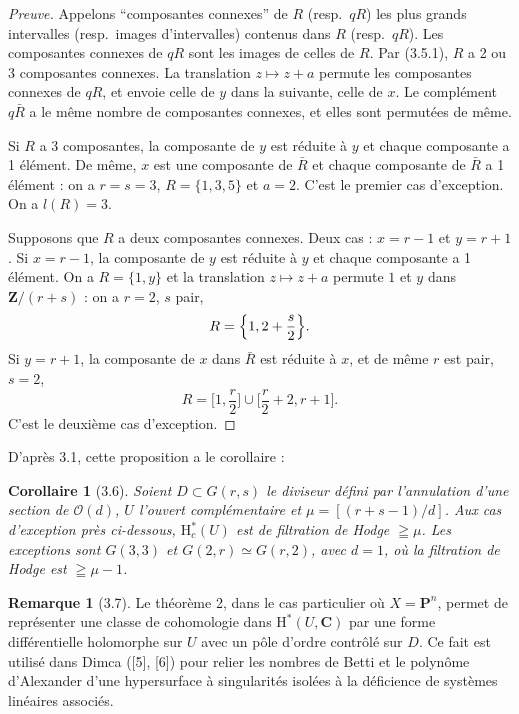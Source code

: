 \documentclass[12pt,a4paper]{article}
\theoremstyle{plain}
\newtheorem{corollary}[theorem]{Corollaire}
\theoremstyle{definition}
\newtheorem{remark}[theorem]{Remarque}
\begin{document}
\begin{proof}[Preuve]
Appelons ``composantes connexes'' de $R$ (resp.\ $qR$) les plus grands intervalles (resp.\ images d'intervalles) contenus dans $R$ (resp.\ $qR$). Les composantes connexes de $qR$ sont les images de celles de $R$. Par (3.5.1), $R$ a 2 ou 3 composantes connexes. La translation $z \mapsto z+a$ permute les composantes connexes de $qR$, et envoie celle de $y$ dans la suivante, celle de $x$. Le complément $q\bar{R}$ a le même nombre de composantes connexes, et elles sont permutées de même.

Si $R$ a 3 composantes, la composante de $y$ est réduite à $y$ et chaque composante a 1 élément. De même, $x$ est une composante de $\bar{R}$ et chaque composante de $\bar{R}$ a 1 élément : on a $r = s = 3$, $R = \{1, 3, 5\}$ et $a = 2$. C'est le premier cas d'exception. On a $l(R) = 3$.

Supposons que $R$ a deux composantes connexes. Deux cas : $x = r-1$ et $y = r+1$. Si $x = r-1$, la composante de $y$ est réduite à $y$ et chaque composante a 1 élément. On a $R = \{1, y\}$ et la translation $z \mapsto z+a$ permute $1$ et $y$ dans $\mathbf{Z}/(r+s)$ : on a $r = 2$, $s$ pair,
\[
R = \Bigl\{1, 2 + \frac{s}{2}\Bigr\}.
\]
Si $y = r+1$, la composante de $x$ dans $\bar{R}$ est réduite à $x$, et de même $r$ est pair, $s = 2$,
\[
R = \biggl[1, \frac{r}{2}\biggr] \cup \biggl[\frac{r}{2} + 2, r+1\biggr].
\]
C'est le deuxième cas d'exception.
\end{proof}

D'après 3.1, cette proposition a le corollaire :

\begin{corollary}[3.6]
Soient $D \subset G(r, s)$ le diviseur défini par l'annulation d'une section de $\mathscr{O}(d)$, $U$ l'ouvert complémentaire et $\mu = [(r+s-1)/d]$. Aux cas d'exception près ci-dessous, $\mathrm{H}_c^*(U)$ est de filtration de Hodge $\geqq \mu$. Les exceptions sont $G(3, 3)$ et $G(2, r) \simeq G(r, 2)$, avec $d = 1$, où la filtration de Hodge est $\geqq \mu - 1$.
\end{corollary}

\begin{remark}[3.7]
Le théorème 2, dans le cas particulier où $X = \mathbf{P}^n$, permet de représenter une classe de cohomologie dans $\mathrm{H}^*(U, \mathbf{C})$ par une forme différentielle holomorphe sur $U$ avec un pôle d'ordre contrôlé sur $D$. Ce fait est utilisé dans Dimca ([5], [6]) pour relier les nombres de Betti et le polynôme d'Alexander d'une hypersurface à singularités isolées à la déficience de systèmes linéaires associés.
\end{remark}
\end{document}
